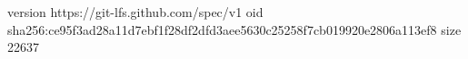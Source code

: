 version https://git-lfs.github.com/spec/v1
oid sha256:ce95f3ad28a11d7ebf1f28df2dfd3aee5630c25258f7cb019920e2806a113ef8
size 22637
